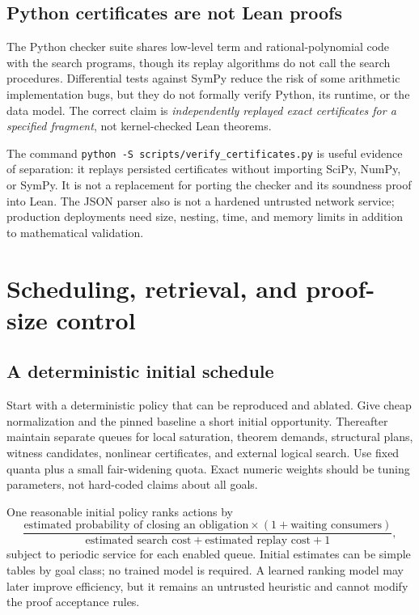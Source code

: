 \documentclass[11pt,a4paper]{article}
\newcommand{\code}[1]{\texttt{#1}}
\begin{document}
\subsection{Python certificates are not Lean proofs}
The Python checker suite shares low-level term and rational-polynomial code
with the search programs, though its replay algorithms do not call the search
procedures. Differential tests against SymPy reduce the risk of some arithmetic
implementation bugs, but they do not formally verify Python, its runtime, or
the data model. The correct claim is \emph{independently replayed exact
certificates for a specified fragment}, not kernel-checked Lean theorems.

The command \code{python -S scripts/verify\_certificates.py} is useful evidence
of separation: it replays persisted certificates without importing SciPy,
NumPy, or SymPy. It is not a replacement for porting the checker and its
soundness proof into Lean. The JSON parser also is not a hardened untrusted
network service; production deployments need size, nesting, time, and memory
limits in addition to mathematical validation.

\section{Scheduling, retrieval, and proof-size control}
\label{sec:scheduling}

\subsection{A deterministic initial schedule}
Start with a deterministic policy that can be reproduced and ablated. Give
cheap normalization and the pinned baseline a short initial opportunity.
Thereafter maintain separate queues for local saturation, theorem demands,
structural plans, witness candidates, nonlinear certificates, and external
logical search. Use fixed quanta plus a small fair-widening quota. Exact numeric
weights should be tuning parameters, not hard-coded claims about all goals.

One reasonable initial policy ranks actions by
\[
 \frac{\text{estimated probability of closing an obligation}
       \times(1+\text{waiting consumers})}
      {\text{estimated search cost}+\text{estimated replay cost}+1},
\]
subject to periodic service for each enabled queue. Initial estimates can be
simple tables by goal class; no trained model is required. A learned ranking
model may later improve efficiency, but it remains an untrusted heuristic and
cannot modify the proof acceptance rules.
\end{document}
